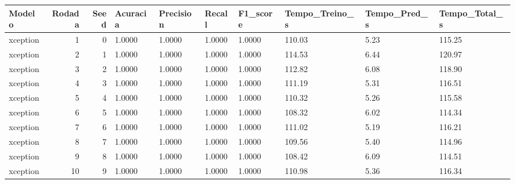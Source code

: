 \begin{tabular}{lrrlllllll}
\toprule
Modelo & Rodada & Seed & Acuracia & Precision & Recall & F1_score & Tempo_Treino_s & Tempo_Pred_s & Tempo_Total_s \\
\midrule
xception & 1 & 0 & 1.0000 & 1.0000 & 1.0000 & 1.0000 & 110.03 & 5.23 & 115.25 \\
xception & 2 & 1 & 1.0000 & 1.0000 & 1.0000 & 1.0000 & 114.53 & 6.44 & 120.97 \\
xception & 3 & 2 & 1.0000 & 1.0000 & 1.0000 & 1.0000 & 112.82 & 6.08 & 118.90 \\
xception & 4 & 3 & 1.0000 & 1.0000 & 1.0000 & 1.0000 & 111.19 & 5.31 & 116.51 \\
xception & 5 & 4 & 1.0000 & 1.0000 & 1.0000 & 1.0000 & 110.32 & 5.26 & 115.58 \\
xception & 6 & 5 & 1.0000 & 1.0000 & 1.0000 & 1.0000 & 108.32 & 6.02 & 114.34 \\
xception & 7 & 6 & 1.0000 & 1.0000 & 1.0000 & 1.0000 & 111.02 & 5.19 & 116.21 \\
xception & 8 & 7 & 1.0000 & 1.0000 & 1.0000 & 1.0000 & 109.56 & 5.40 & 114.96 \\
xception & 9 & 8 & 1.0000 & 1.0000 & 1.0000 & 1.0000 & 108.42 & 6.09 & 114.51 \\
xception & 10 & 9 & 1.0000 & 1.0000 & 1.0000 & 1.0000 & 110.98 & 5.36 & 116.34 \\
\bottomrule
\end{tabular}
